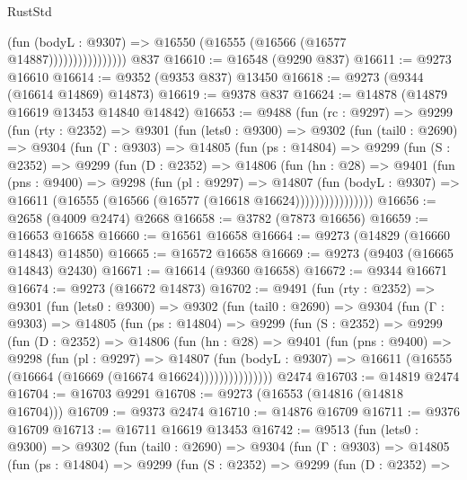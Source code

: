 \begin{lexlean}{RustStd}
\begin{coremodule}
                            (fun (bodyL : @9307) =>
                            @16550 (@16555 (@16566 (@16577 @14887))))))))))))))))
    @837
@16610 := @16548 (@9290 @837)
@16611 := @9273 @16610
@16614 := @9352 (@9353 @837) @13450
@16618 := @9273 (@9344 (@16614 @14869) @14873)
@16619 := @9378 @837
@16624 := @14878 (@14879 @16619 @13453 @14840 @14842)
@16653 := @9488
    (fun (rc : @9297) =>
    @9299
      (fun (rty : @2352) =>
      @9301
        (fun (lets0 : @9300) =>
        @9302
          (fun (tail0 : @2690) =>
          @9304
            (fun (Γ : @9303) =>
            @14805
              (fun (ps : @14804) =>
              @9299
                (fun (S : @2352) =>
                @9299
                  (fun (D : @2352) =>
                  @14806
                    (fun (hn : @28) =>
                    @9401
                      (fun (pns : @9400) =>
                      @9298
                        (fun (pl : @9297) =>
                        @14807
                          (fun (bodyL : @9307) =>
                          @16611 (@16555 (@16566 (@16577 (@16618 @16624))))))))))))))))
@16656 := @2658 (@4009 @2474) @2668
@16658 := @3782 (@7873 @16656)
@16659 := @16653 @16658
@16660 := @16561 @16658
@16664 := @9273 (@14829 (@16660 @14843) @14850)
@16665 := @16572 @16658
@16669 := @9273 (@9403 (@16665 @14843) @2430)
@16671 := @16614 (@9360 @16658)
@16672 := @9344 @16671
@16674 := @9273 (@16672 @14873)
@16702 := @9491
    (fun (rty : @2352) =>
    @9301
      (fun (lets0 : @9300) =>
      @9302
        (fun (tail0 : @2690) =>
        @9304
          (fun (Γ : @9303) =>
          @14805
            (fun (ps : @14804) =>
            @9299
              (fun (S : @2352) =>
              @9299
                (fun (D : @2352) =>
                @14806
                  (fun (hn : @28) =>
                  @9401
                    (fun (pns : @9400) =>
                    @9298
                      (fun (pl : @9297) =>
                      @14807
                        (fun (bodyL : @9307) =>
                        @16611 (@16555 (@16664 (@16669 (@16674 @16624)))))))))))))))
    @2474
@16703 := @14819 @2474
@16704 := @16703 @9291
@16708 := @9273 (@16553 (@14816 (@14818 @16704)))
@16709 := @9373 @2474
@16710 := @14876 @16709
@16711 := @9376 @16709
@16713 := @16711 @16619 @13453
@16742 := @9513
    (fun (lets0 : @9300) =>
    @9302
      (fun (tail0 : @2690) =>
      @9304
        (fun (Γ : @9303) =>
        @14805
          (fun (ps : @14804) =>
          @9299
            (fun (S : @2352) =>
            @9299
              (fun (D : @2352) =>

\end{coremodule}
\end{lexlean}

